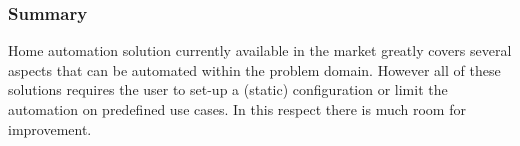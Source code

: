 \subsubsection{Summary}
Home automation solution currently available in the market greatly covers several aspects that can be automated within the problem domain. However all of these solutions requires the user to set-up a (static) configuration or limit the automation on predefined use cases. In this respect there is much room for improvement.
